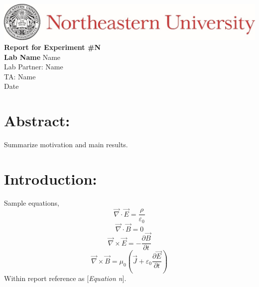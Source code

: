 \documentclass[12pt,a4paper]{article}
\begin{document}
\begin{center}
	\includegraphics{Header}
	\vfill		
	\textbf{\Large{Report for Experiment \#N\\
	Lab Name}}
	\vfill
	Name\\
	Lab Partner: Name\\
	TA: Name\\
	Date
	\vfill
\end{center}
	
\section*{Abstract:}
	Summarize motivation and main results.
	
\newpage
	
\section*{Introduction:}
	Sample equations,
	\[ \vec{\nabla} \cdot \vec{E} = \frac{\rho}{\varepsilon_0} \tag{1} \]
	\[ \vec{\nabla} \cdot \vec{B} = 0 \tag{2} \]
	\[ \vec{\nabla} \times \vec{E} = - \frac{\partial \vec{B}}{\partial t} \tag{3} \]
	\[ \vec{\nabla} \times \vec{B} = \mu_0 \left( \vec{J} + \varepsilon_0 \frac{\partial \vec{E}}{\partial t} \right) \tag{4} \]
	Within report reference as [\textit{Equation n}].
\end{document}

